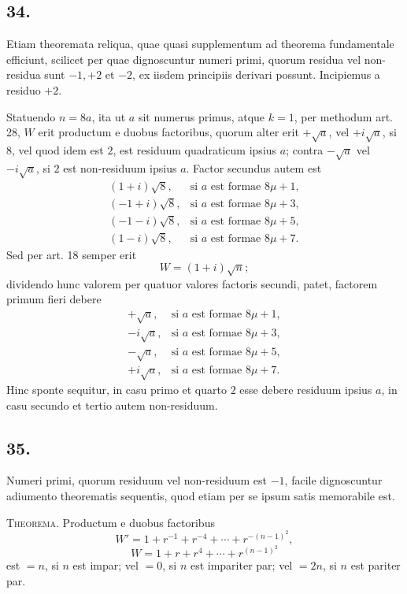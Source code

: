 \documentclass[12pt]{article}
\begin{document}
\subsection*{34.}

Etiam theoremata reliqua, quae quasi supplementum ad theorema fundamentale efficiunt, scilicet per quae dignoscuntur numeri primi, quorum residua vel non-residua sunt $-1,+2$ et $-2$, ex iisdem principiis derivari possunt. Incipiemus a residuo $+2$.

Statuendo $n=8a$, ita ut $a$ sit numerus primus, atque $k=1$, per methodum art. 28, $W$ erit productum e duobus factoribus, quorum alter erit $+\sqrt a$, vel $+i\sqrt a$, si $8$, vel quod idem est $2$, est residuum quadraticum ipsius $a$; contra $-\sqrt a$ vel $-i\sqrt a$, si $2$ est non-residuum ipsius $a$. Factor secundus autem est
\[
\begin{array}{ll}
(1+i)\sqrt8, & \text{si }a\text{ est formae }8\mu+1,\\
(-1+i)\sqrt8, & \text{si }a\text{ est formae }8\mu+3,\\
(-1-i)\sqrt8, & \text{si }a\text{ est formae }8\mu+5,\\
(1-i)\sqrt8, & \text{si }a\text{ est formae }8\mu+7.
\end{array}
\]
Sed per art. 18 semper erit
\[
W=(1+i)\sqrt n;
\]
dividendo hunc valorem per quatuor valores factoris secundi, patet, factorem primum fieri debere
\[
\begin{array}{ll}
+\sqrt a, & \text{si }a\text{ est formae }8\mu+1,\\
-i\sqrt a, & \text{si }a\text{ est formae }8\mu+3,\\
-\sqrt a, & \text{si }a\text{ est formae }8\mu+5,\\
+i\sqrt a, & \text{si }a\text{ est formae }8\mu+7.
\end{array}
\]
Hinc sponte sequitur, in casu primo et quarto $2$ esse debere residuum ipsius $a$, in casu secundo et tertio autem non-residuum.

\subsection*{35.}

Numeri primi, quorum residuum vel non-residuum est $-1$, facile dignoscuntur adiumento theorematis sequentis, quod etiam per se ipsum satis memorabile est.

\textsc{Theorema.} Productum e duobus factoribus
\[
W'=1+r^{-1}+r^{-4}+\cdots+r^{-(n-1)^2},
\]
\[
W=1+r+r^4+\cdots+r^{(n-1)^2}
\]
est $=n$, si $n$ est impar; vel $=0$, si $n$ est impariter par; vel $=2n$, si $n$ est pariter par.
\end{document}
